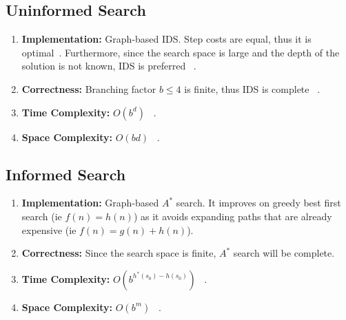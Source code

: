 \documentclass[runningheads]{llncs}
\begin{document}
\subsection{Uninformed Search}
\begin{enumerate}
    \item \textbf{Implementation:} Graph-based IDS. Step costs are equal, thus it is optimal~\cite[p88]{stuart_russell_artifical_2010}. Furthermore, since the search space is large and the depth of the solution is not known, IDS is preferred ~\cite[p90]{stuart_russell_artifical_2010}.
    \item \textbf{Correctness:} Branching factor \( b \leq 4 \) is finite, thus IDS is complete ~\cite[p88-90]{stuart_russell_artifical_2010}. 
    \item \textbf{Time Complexity:} \( O(b^d) \) ~\cite[p88-90]{stuart_russell_artifical_2010}.
    \item \textbf{Space Complexity:} \( O(bd) \) ~\cite[p88-90]{stuart_russell_artifical_2010}.
\end{enumerate}

\subsection{Informed Search}
\begin{enumerate}
    \item \textbf{Implementation:} Graph-based \( A^* \) search. It improves on greedy best first search (ie \( f(n) = h(n) \)) as it avoids expanding paths that are already expensive (ie \( f(n) = g(n) + h(n) \)).
    \item \textbf{Correctness:} Since the search space is finite, \( A^* \) search will be complete.
    \item \textbf{Time Complexity:} \( O(b^{h^*(s_0) - h(s_0)}) \) ~\cite[p93-99]{stuart_russell_artifical_2010}.
    \item \textbf{Space Complexity:} \( O(b^m) \) ~\cite[p93-99]{stuart_russell_artifical_2010}.
\end{enumerate}
\end{document}
